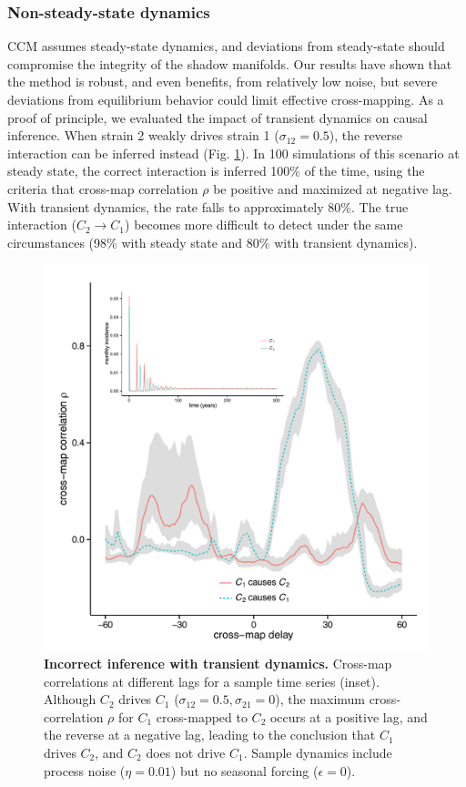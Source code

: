 \documentclass[10pt]{article}
\begin{document}
\subsubsection{Non-steady-state dynamics}
CCM assumes steady-state dynamics, and deviations from steady-state should compromise the integrity of the shadow manifolds.
Our results have shown that the method is robust, and even benefits, from relatively low noise, but severe deviations from equilibrium behavior could limit effective cross-mapping.
As a proof of principle, we evaluated the impact of transient dynamics on causal inference.
When strain 2 weakly drives strain 1 ($\sigma_{12}=0.5$), the reverse interaction can be inferred instead (Fig. \ref{fig:nonstationary_tmp}).
In 100 simulations of this scenario at steady state, the correct interaction is inferred 100\% of the time, using the criteria that cross-map correlation $\rho$ be positive and maximized at negative lag.
With transient dynamics, the rate falls to approximately 80\%.
The true interaction ($C_2 \rightarrow C_1$) becomes more difficult to detect under the same circumstances (98\% with steady state and 80\% with transient dynamics).

\begin{figure}
\begin{center}
  \includegraphics[width=5in]{dataflow/out/fig_transient/fig_transient.pdf}
  \end{center}
  \caption{\textbf{Incorrect inference with transient dynamics.} Cross-map correlations at different lags for a sample time series (inset). Although $C_2$ drives $C_1$ ($\sigma_{12}= 0.5, \sigma_{21}=0$), the maximum cross-correlation $\rho$ for $C_1$ cross-mapped to $C_2$ occurs at a positive lag, and the reverse at a negative lag, leading to the conclusion that $C_1$ drives $C_2$, and $C_2$ does not drive $C_1$. Sample dynamics include process noise ($\eta=0.01$) but no seasonal forcing ($\epsilon=0$). \label{fig:nonstationary_tmp}} 
\end{figure}
\end{document}
